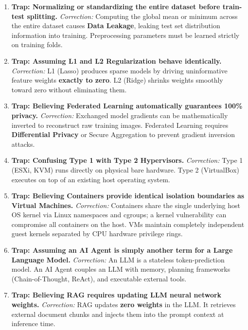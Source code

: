 \begin{enumerate}[label=\arabic*.,leftmargin=2em]
    \item \textbf{Trap: Normalizing or standardizing the entire dataset before train-test splitting.}
    \textit{Correction:} Computing the global mean or minimum across the entire dataset causes \textbf{Data Leakage}, leaking test set distribution information into training. Preprocessing parameters must be learned strictly on training folds.

    \item \textbf{Trap: Assuming L1 and L2 Regularization behave identically.}
    \textit{Correction:} L1 (Lasso) produces sparse models by driving uninformative feature weights \textbf{exactly to zero}. L2 (Ridge) shrinks weights smoothly toward zero without eliminating them.

    \item \textbf{Trap: Believing Federated Learning automatically guarantees 100\% privacy.}
    \textit{Correction:} Exchanged model gradients can be mathematically inverted to reconstruct raw training images. Federated Learning requires \textbf{Differential Privacy} or Secure Aggregation to prevent gradient inversion attacks.

    \item \textbf{Trap: Confusing Type 1 with Type 2 Hypervisors.}
    \textit{Correction:} Type 1 (ESXi, KVM) runs directly on physical bare hardware. Type 2 (VirtualBox) executes on top of an existing host operating system.

    \item \textbf{Trap: Believing Containers provide identical isolation boundaries as Virtual Machines.}
    \textit{Correction:} Containers share the single underlying host OS kernel via Linux namespaces and cgroups; a kernel vulnerability can compromise all containers on the host. VMs maintain completely independent guest kernels separated by CPU hardware privilege rings.

    \item \textbf{Trap: Assuming an AI Agent is simply another term for a Large Language Model.}
    \textit{Correction:} An LLM is a stateless token-prediction model. An AI Agent couples an LLM with memory, planning frameworks (Chain-of-Thought, ReAct), and executable external tools.

    \item \textbf{Trap: Believing RAG requires updating LLM neural network weights.}
    \textit{Correction:} RAG updates \textbf{zero weights} in the LLM. It retrieves external document chunks and injects them into the prompt context at inference time.


\end{enumerate}
